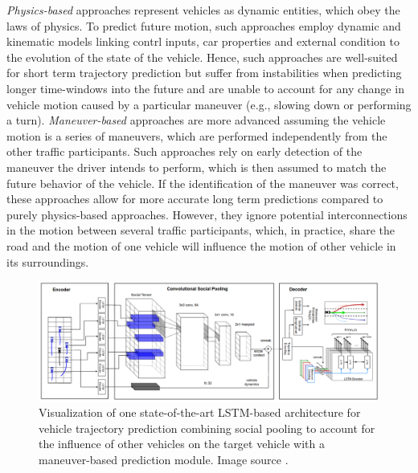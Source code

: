 \emph{Physics-based} approaches represent vehicles as dynamic entities, which obey the laws of physics.
To predict future motion, such approaches employ dynamic and kinematic models linking contrl inputs, car properties and external condition to the evolution of the state of the vehicle.
Hence, such approaches are well-suited for short term trajectory prediction but suffer from instabilities when predicting longer time-windows into the future and are unable to account for any change in vehicle motion caused by a particular maneuver (e.g., slowing down or performing a turn). 
\emph{Maneuver-based} approaches are more advanced assuming the vehicle motion is a series  of maneuvers, which are performed independently from the other traffic participants.
Such approaches rely on early detection of the maneuver the driver intends to perform, which is then assumed to match the future behavior of the vehicle.
If the identification of the maneuver was correct, these approaches allow for more accurate long term predictions compared to purely physics-based approaches.
However, they ignore potential interconnections in the motion between several traffic participants, which, in practice, share the road and the motion of one vehicle will influence the motion of other vehicle in its surroundings.

\begin{figure}[t!]
    \centering
    \includegraphics[width=0.95\linewidth]{imgs/deo_lstm_prediction_arch.png}
    \caption{Visualization of one state-of-the-art \ac{LSTM}-based architecture for vehicle trajectory prediction combining social pooling to account for the influence of other vehicles on the target vehicle with a maneuver-based prediction module. Image source \cite{Deo2018a}.}
    \label{fig:deo_lstm_prediction_arch}
\end{figure}

